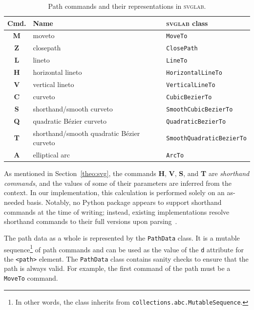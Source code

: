 \begin{table}[H]
    \centering
    
    \begin{tabular}{c p{5cm} l}
        \toprule
        \textbf{Cmd.} & \textbf{Name} & \textbf{\textsc{svglab} class} \\
        \midrule
        \textbf{M} & moveto & \texttt{MoveTo} \\
        \textbf{Z} & closepath & \texttt{ClosePath} \\ \hline
        \textbf{L} & lineto & \texttt{LineTo} \\
        \textbf{H} & horizontal lineto & \texttt{HorizontalLineTo} \\
        \textbf{V} & vertical lineto & \texttt{VerticalLineTo} \\ \hline
        \textbf{C} & curveto & \texttt{CubicBezierTo} \\
        \textbf{S} & shorthand\slash smooth curveto & \texttt{SmoothCubicBezierTo} \\ \hline
        \textbf{Q} & quadratic Bézier curveto & \texttt{QuadraticBezierTo} \\
        \textbf{T} & shorthand\slash smooth quadratic Bézier curveto & \texttt{SmoothQuadraticBezierTo} \\ \hline
        \textbf{A} & elliptical arc & \texttt{ArcTo} \\
        \bottomrule
    \end{tabular}
    
    \caption{Path commands and their representations in \textsc{svglab}.}
    \label{tab:path-commands}
\end{table}

As mentioned in Section~\ref{theo:svg}, the commands \textbf{H}, \textbf{V}, \textbf{S}, and \textbf{T} are \emph{shorthand commands}, and the values of some of their parameters are inferred from the context. In our implementation, this calculation is performed solely on an as-needed basis. Notably, no Python package appears to support shorthand commands at the time of writing; instead, existing implementations resolve shorthand commands to their full versions upon parsing~\cite{svgelements, svgpathtools, regebro2013svgpath}.

The path data as a whole is represented by the \texttt{PathData} class. It is a mutable sequence\footnote{In other words, the class inherits from \texttt{collections.abc.MutableSequence}.} of path commands and can be used as the value of the \texttt{d} attribute for the \texttt{<path>} element. The \texttt{PathData} class contains sanity checks to ensure that the path is always valid. For example, the first command of the path must be a \texttt{MoveTo} command.

